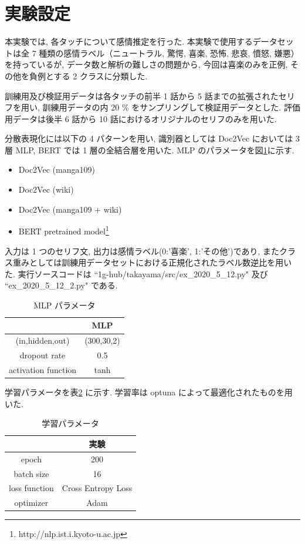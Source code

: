 \documentclass[twocolumn]{jarticle}     %
\begin{document}
\section{実験設定}
本実験では, 各タッチについて感情推定を行った.
本実験で使用するデータセットは全 7 種類の感情ラベル（ニュートラル, 驚愕, 喜楽, 恐怖, 悲哀, 憤怒, 嫌悪）
を持っているが, データ数と解析の難しさの問題から, 今回は喜楽のみを正例, その他を負例とする 2 クラスに分類した.

訓練用及び検証用データは各タッチの前半 1 話から 5 話までの拡張されたセリフを用い, 訓練用データの内 20 \% をサンプリングして検証用データとした.
評価用データは後半 6 話から 10 話におけるオリジナルのセリフのみを用いた.

分散表現化には以下の 4 パターンを用い, 識別器としては Doc2Vec においては 3 層 MLP, BERT では 1 層の全結合層を用いた. MLP のパラメータを図\ref{table:net_para}に示す.
\begin{itemize}
  \item Doc2Vec (manga109)
  \item Doc2Vec (wiki)
  \item Doc2Vec (manga109 + wiki)
  \item BERT pretrained model\footnote{http://nlp.ist.i.kyoto-u.ac.jp}
\end{itemize}

入力は 1 つのセリフ文, 出力は感情ラベル(0:'喜楽', 1:'その他')であり, またクラス重みとしては訓練用データセットにおける正規化されたラベル数逆比を用いた.
実行ソースコードは ``1g-hub/takayama/src/ex\_2020\_5\_12.py" 及び ``ex\_2020\_5\_12\_2.py" である.

\begin{table}
\caption{MLP パラメータ}
\label{table:net_para}
\centering
\begin{tabular}{|c||c|}
\hline
& MLP \\ \hline
(in,hidden,out) & (300,30,2)\\ \hline
dropout rate & 0.5 \\ \hline
activation function & tanh\\ \hline
\end{tabular}
\end{table}


学習パラメータを表\ref{table:ex_para} に示す. 学習率は optuna によって最適化されたものを用いた.

\begin{table}
\caption{学習パラメータ}
\label{table:ex_para}
\centering
\begin{tabular}{|c||c|c|}
\hline
& \multicolumn{2}{|c|}{実験} \\ \hline
epoch & \multicolumn{2}{|c|}{200}  \\ \hline
batch size & \multicolumn{2}{|c|}{16} \\ \hline
loss function & \multicolumn{2}{|c|}{Cross Entropy Loss} \\ \hline
optimizer & \multicolumn{2}{|c|}{Adam} \\ \hline
\end{tabular}
\end{table}
\end{document}
